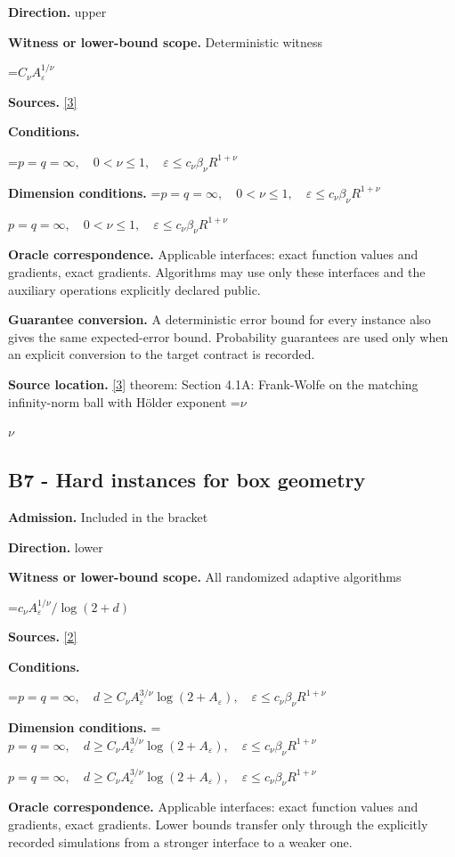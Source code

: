 \documentclass[10pt,a4paper]{article}
\newcommand{\AtlasMath}[1]{\par\begingroup\centering\setbox0=\hbox{$\displaystyle #1$}\ifdim\wd0>1.4\linewidth\typeout{ATLAS WIDE FORMULA: \the\wd0}\fi\ifdim\wd0>\linewidth\resizebox{\linewidth}{!}{\box0}\else\box0\fi\par\endgroup}
\newcommand{\AtlasInlineMath}[1]{\begingroup\setbox0=\hbox{$#1$}\ifdim\wd0>.4\linewidth\endgroup\AtlasMath{#1}\else\endgroup$#1$\fi}
\begin{document}
\textbf{Direction.} upper

\textbf{Witness or lower-bound scope.} Deterministic witness

\AtlasMath{C_\nu A_\varepsilon^{1/\nu}}
\textbf{Sources.} \href{https://arxiv.org/pdf/1307.5001}{[3]}

\textbf{Conditions.} 
\AtlasMath{p=q=\infty,\quad0<\nu\le1,\quad\varepsilon\le c_\nu\beta_\nu R^{1+\nu}}


\textbf{Dimension conditions.} \AtlasInlineMath{p=q=\infty,\quad0<\nu\le1,\quad\varepsilon\le c_\nu\beta_\nu R^{1+\nu}}

\textbf{Oracle correspondence.} Applicable interfaces: exact function values and gradients, exact gradients. Algorithms may use only these interfaces and the auxiliary operations explicitly declared public.

\textbf{Guarantee conversion.} A deterministic error bound for every instance also gives the same expected-error bound. Probability guarantees are used only when an explicit conversion to the target contract is recorded.

\textbf{Source location.} \href{https://arxiv.org/pdf/1307.5001}{[3]} theorem: Section 4.1A: Frank-Wolfe on the matching infinity-norm ball with Hölder exponent \AtlasInlineMath{\nu}

\subsection{B7 - Hard instances for box geometry}
\textbf{Admission.} Included in the bracket

\textbf{Direction.} lower

\textbf{Witness or lower-bound scope.} All randomized adaptive algorithms

\AtlasMath{c_\nu A_\varepsilon^{1/\nu}/\log(2+d)}
\textbf{Sources.} \href{https://proceedings.mlr.press/v99/diakonikolas19c/diakonikolas19c.pdf}{[2]}

\textbf{Conditions.} 
\AtlasMath{p=q=\infty,\quad d\ge C_\nu A_\varepsilon^{3/\nu}\log(2+A_\varepsilon),\quad\varepsilon\le c_\nu\beta_\nu R^{1+\nu}}


\textbf{Dimension conditions.} \AtlasInlineMath{p=q=\infty,\quad d\ge C_\nu A_\varepsilon^{3/\nu}\log(2+A_\varepsilon),\quad\varepsilon\le c_\nu\beta_\nu R^{1+\nu}}

\textbf{Oracle correspondence.} Applicable interfaces: exact function values and gradients, exact gradients. Lower bounds transfer only through the explicitly recorded simulations from a stronger interface to a weaker one.
\end{document}

